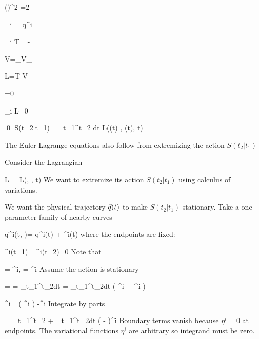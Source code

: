 \beq
{}(\dot{\vecr})^2
=2 \dot{\vecr}\cdot
{}
\eeq


\beq
\Lambda_i 
= \ddot{\vecr}
\cdot
\pder{{\vecr}}
{{q}^i}
\eeq

\beq
\Lambda_i T=
-\sum_\alp {}
\eeq

\beq
V=\sum_\alp V_\alp
\eeq

\beq
L=T-V
\eeq

\beq
{}=0
\eeq

\beq
\Lambda_i L=0
\eeq



\qed
\beq
S(t_2|t_1)=
\int_{t_1}^{t_2}
dt\;
L(\vecq(t)
, \dot{\vecq}(t), t)
\label{eq-lagrangian-action}
\eeq

\begin{claim}
The Euler-Lagrange equations also follow from 
extremizing 
the action $S(t_2|t_1)$

\end{claim}
\proof

Consider the 
Lagrangian

\beq
L = L(\vecq,
\dot{\vecq}, t)
\eeq
We want to extremize
its action $S(t_2|t_1)$
using calculus of variations.


We want the physical trajectory ${\vec{q}}(t)$ to make $S(t_2|t_1)$ stationary.
Take a one-parameter family of nearby curves

\beq
q^i(t, \eps)=
q^i(t)
+
\eps \eta^i(t)
\eeq
where the endpoints
are fixed:

\beq
\eta^i(t_1)=
\eta^i(t_2)=0
\eeq
Note that

\beq
{}=
{\eta}^i,\quad
{}=
\dot{\eta}^i
\eeq
Assume the action is stationary

=
=
\int_{t_1}^{t_2}dt\;
=
\int_{t_1}^{t_2}dt\;
\left(
\eta^i
+
\dot{\eta}^i
\right)
\eeq

\beq
{}
\dot{\eta}^i=
\left(
{\eta}^i
\right)
-{\eta}^i
\eeq
Integrate by parts

=
_{t_1}^{t_2}
+
\int_{t_1}^{t_2}dt\;
\left(
-
\right)\eta^i
\eeq
Boundary terms vanish because $\eta^i=0$ at endpoints. The variational functions $\eta^i$
are arbitrary so integrand must be zero.


